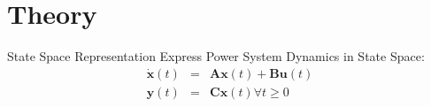 \section[Theory]{Theory}
\label{sec:lasso_theory}

\begin{frame}[fragile]{State Space Representation}
	Express Power System Dynamics in State Space:
	\begin{equation}
		\label{eq:ssr}
		\begin{align}
			\dot{\textbf{x}}(t) & = 
			& \textbf{A}\textbf{x}(t)
			+ \textbf{B}\textbf{u}(t)\\
			\textbf{y}(t) & = 
			& \textbf{C}\textbf{x}(t)  
			\forall t\geq0
		\end{align}
	\end{equation}
\end{frame}